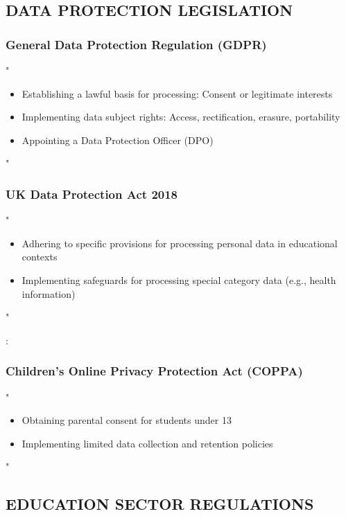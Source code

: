 \documentclass[14pt,a4paper]{article}
\begin{document}
\subsection*{DATA PROTECTION LEGISLATION}

\subsubsection*{General Data Protection Regulation (GDPR)}
"
\begin{itemize}
    \item Establishing a lawful basis for processing: Consent or legitimate interests
    \item Implementing data subject rights: Access, rectification, erasure, portability
    \item Appointing a Data Protection Officer (DPO)
\end{itemize}
"

\textit{\parencite{EU2016}}

\subsubsection*{UK Data Protection Act 2018}
"
\begin{itemize}
    \item Adhering to specific provisions for processing personal data in educational contexts
    \item Implementing safeguards for processing special category data (e.g., health information)
\end{itemize}
"

\textit{\parencite{UKGov2018}}:

\subsubsection*{Children's Online Privacy Protection Act (COPPA)}
"
\begin{itemize}
    \item Obtaining parental consent for students under 13
    \item Implementing limited data collection and retention policies
\end{itemize}
"


\textit{\parencite{FTC2023}}

\subsection*{EDUCATION SECTOR REGULATIONS}
\end{document}
